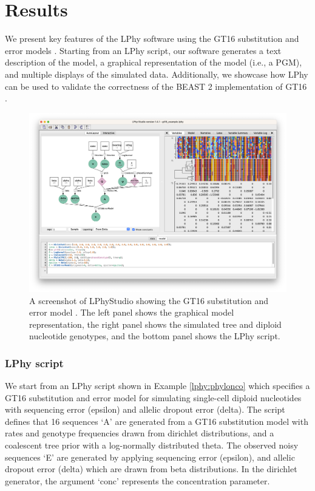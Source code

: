 \documentclass[10pt,letterpaper,table]{article}
\theoremstyle{definition}
\begin{document}
\section{Results}
We present key features of the LPhy software using the GT16 substitution and error models \cite{kozlov2022cellphy}. 
Starting from an LPhy script, our software generates a text description of the model, a graphical representation of the model (i.e., a PGM), and multiple displays of the simulated data. 
Additionally, we showcase how LPhy can be used to validate the correctness of the BEAST 2 implementation of GT16 \cite{chen2022accounting}. 

\begin{figure}[!ht]
    \centering
    \includegraphics[width=\textwidth]{figs_plos/phylonco.png }
    \caption{A screenshot of LPhyStudio showing the GT16 substitution and error model \cite{kozlov2022cellphy, chen2022accounting}. 
    The left panel shows the graphical model representation, the right panel shows the simulated tree and diploid nucleotide genotypes, and the bottom panel shows the LPhy script. }
\end{figure}

\subsubsection*{LPhy script}
We start from an LPhy script shown in Example \ref{lphy:phylonco} which specifies a GT16 substitution and error model \cite{kozlov2022cellphy} for simulating single-cell diploid nucleotides with sequencing error (epsilon) and allelic dropout error (delta).
The script defines that 16 sequences `A' are generated from a GT16 substitution model with rates and genotype frequencies drawn from dirichlet distributions, and a coalescent tree prior with a log-normally distributed theta.
The observed noisy sequences `E' are generated by applying sequencing error (epsilon), and allelic dropout error (delta) which are drawn from beta distributions. 
In the dirichlet generator, the argument `conc' represents the concentration parameter. 
\end{document}

